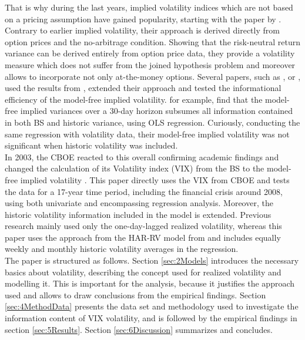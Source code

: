 That is why during the last years, implied volatility indices which are not based on a pricing assumption have gained popularity, starting with the paper by \textcite{britten2000}. Contrary to earlier implied volatility, their approach is derived directly from option prices and the no-arbitrage condition. Showing that the risk-neutral return variance can be derived entirely from option price data, they provide a volatility measure which does not suffer from the joined hypothesis problem and moreover allows to incorporate not only at-the-money options.
Several papers, such as \textcite{bakanova2010}, \textcite{taylor2010} or \textcite{jiang2003}, used the results from \textcite{britten2000}, extended their approach and tested the informational efficiency of the model-free implied volatility. \textcite{jiang2003} for example, find that the model-free implied variances over a 30-day horizon subsumes all information contained in both \ac{BS} and historic variance, using OLS regression. Curiously, conducting the same regression with volatility data, their model-free implied volatility was not significant when historic volatility was included.\\
In 2003, the \ac{CBOE} reacted to this overall confirming academic findings and changed the calculation of its Volatility index (\ac{VIX}) from the \ac{BS} to the model-free implied volatility \parencite{whaley1995}. This paper directly uses the \ac{VIX} from \ac{CBOE} and tests the data for a 17-year time period, including the financial crisis around 2008, using both univariate and encompassing regression analysis. Moreover, the historic volatility information included in the model is extended. Previous research mainly used only the one-day-lagged realized volatility, whereas this paper uses the approach from the HAR-RV model from \textcite{corsi2009} and includes equally weekly and monthly historic volatility averages in the regression. \\
The paper is structured as follows. Section \ref{sec:2Models} introduces the necessary basics about volatility, describing the concept used for realized volatility and modelling it. This is important for the analysis, because it justifies the approach used and allows to draw conclusions from the empirical findings. Section \ref{sec:4MethodData} presents the data set and methodology used to investigate the information content of \ac{VIX} volatility, and is followed by the empirical findings in section \ref{sec:5Results}. Section \ref{sec:6Discussion} summarizes and concludes.

